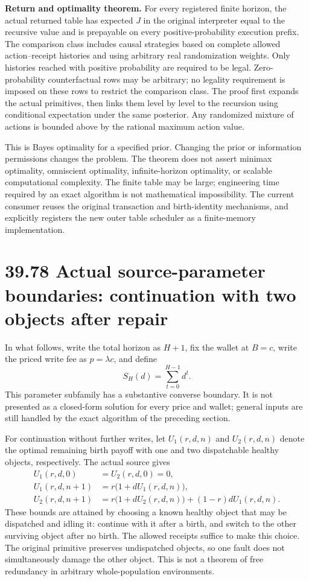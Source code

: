\documentclass[
  english,
  11pt,
  oneside]{book}
\begin{document}
\textbf{Return and optimality theorem.} For every registered finite horizon, the actual returned table has expected \(J\) in the original interpreter equal to the recursive value and is prepayable on every positive-probability execution prefix. The comparison class includes causal strategies based on complete allowed action--receipt histories and using arbitrary real randomization weights. Only histories reached with positive probability are required to be legal. Zero-probability counterfactual rows may be arbitrary; no legality requirement is imposed on these rows to restrict the comparison class. The proof first expands the actual primitives, then links them level by level to the recursion using conditional expectation under the same posterior. Any randomized mixture of actions is bounded above by the rational maximum action value.

This is Bayes optimality for a specified prior. Changing the prior or information permissions changes the problem. The theorem does not assert minimax optimality, omniscient optimality, infinite-horizon optimality, or scalable computational complexity. The finite table may be large; engineering time required by an exact algorithm is not mathematical impossibility. The current consumer reuses the original transaction and birth-identity mechanisms, and explicitly registers the new outer table scheduler as a finite-memory implementation.

\section{39.78 Actual source-parameter boundaries: continuation with two objects after repair}\label{actual-source-parameter-boundaries-continuation-with-two-objects-after-repair}

In what follows, write the total horizon as \(H+1\), fix the wallet at \(B=c\), write the priced write fee as \(p=\lambda c\), and define \[S_H(d)=\sum_{t=0}^{H-1}d^t.\] This parameter subfamily has a substantive converse boundary. It is not presented as a closed-form solution for every price and wallet; general inputs are still handled by the exact algorithm of the preceding section.

For continuation without further writes, let \(U_1(r,d,n)\) and \(U_2(r,d,n)\) denote the optimal remaining birth payoff with one and two dispatchable healthy objects, respectively. The actual source gives \[\begin{aligned}
U_1(r,d,0)&=U_2(r,d,0)=0,\\
U_1(r,d,n+1)&=r\bigl(1+dU_1(r,d,n)\bigr),\\
U_2(r,d,n+1)&=r\bigl(1+dU_2(r,d,n)\bigr)
 +(1-r)dU_1(r,d,n).
\end{aligned}\] These bounds are attained by choosing a known healthy object that may be dispatched and idling it: continue with it after a birth, and switch to the other surviving object after no birth. The allowed receipts suffice to make this choice. The original primitive preserves undispatched objects, so one fault does not simultaneously damage the other object. This is not a theorem of free redundancy in arbitrary whole-population environments.
\end{document}
